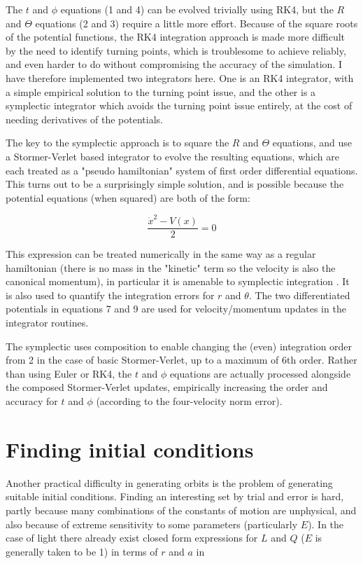 \documentclass[11pt]{article}
\begin{document}
The $t$ and $\phi$ equations (1 and 4) can be evolved trivially using RK4, but the $R$ and $\Theta$ equations (2 and 3) require a little more effort.
Because of the square roots of the potential functions, the RK4 integration approach is made more difficult by the need to identify turning points, which is troublesome to achieve reliably, and even harder to do without compromising the accuracy of the simulation.
I have therefore implemented two integrators here.
One is an RK4 integrator, with a simple empirical solution to the turning point issue, and the other is a symplectic integrator which avoids the turning point issue entirely, at the cost of needing derivatives of the potentials.

The key to the symplectic approach is to square the $R$ and $\Theta$ equations, and use a Stormer-Verlet based integrator \cite{hairer} to evolve the resulting equations, which are each treated as a "pseudo hamiltonian" system of first order differential equations.  This turns out to be a surprisingly simple solution, and is possible because the potential equations (when squared) are both of the form:

\begin{equation}
\frac {\dot x^2 - V(x)}{2} = 0
\end{equation}

This expression can be treated numerically in the same way as a regular hamiltonian (there is no mass in the "kinetic" term so the velocity is also the canonical momentum), in particular it is amenable to symplectic integration \cite{hairer}.
It is also used to quantify the integration errors for $r$ and $\theta$.
The two differentiated potentials in equations 7 and 9 are used for velocity/momentum updates in the integrator routines.

The symplectic uses composition \cite{hairer} to enable changing the (even) integration order from 2 in the case of basic Stormer-Verlet, up to a maximum of 6th order.
Rather than using Euler or RK4, the $t$ and $\phi$ equations are actually processed alongside the composed Stormer-Verlet updates, empirically increasing the order and accuracy for $t$ and $\phi$ (according to the four-velocity norm error).

\section{Finding initial conditions}

Another practical difficulty in generating orbits is the problem of generating suitable initial conditions. Finding an interesting set by trial and error is hard, partly because many combinations of the constants of motion are unphysical, and also because of extreme sensitivity to some parameters (particularly $E$).
In the case of light there already exist closed form expressions for $L$ and $Q$ ($E$ is generally taken to be 1) in terms of $r$ and $a$ in \cite{teo}
\end{document}
